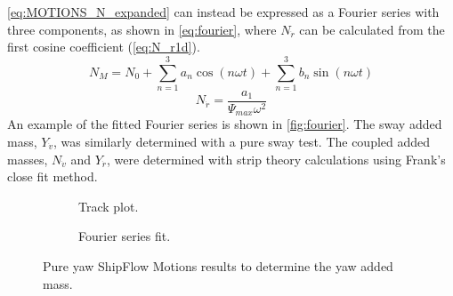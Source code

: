 \autoref{eq:MOTIONS_N_expanded} can instead be expressed as a Fourier series with three components, as shown in \autoref{eq:fourier}, where $N_{\dot{r}}$ can be calculated from the first cosine coefficient (\autoref{eq:N_r1d}).
\begin{equation}
    N_M = N_0 + \sum_{n=1}^3a_n \cos(n \omega t) + \sum_{n=1}^3b_n \sin(n \omega t) 
    \label{eq:fourier}
\end{equation}
\begin{equation}
    N_{\dot{r}} = \frac{a_1}{\Psi_{max} \omega^{2}}
    \label{eq:N_r1d}
\end{equation}
An example of the fitted Fourier series is shown in \autoref{fig:fourier}. The sway added mass, $Y_{\dot{v}}$, was similarly determined with a pure sway test. The coupled added masses, $N_{\dot{v}}$ and $Y_{\dot{r}}$, were determined with strip theory calculations using Frank's close fit method.
\begin{figure}[h]
    \centering
    \begin{subfigure}[b]{0.49\textwidth}
        
        \caption{Track plot.}
    \end{subfigure}
    \hfill
    \begin{subfigure}[b]{0.49\textwidth}
        
        \caption{Fourier series fit.}
    \end{subfigure}
    \caption{Pure yaw ShipFlow Motions results to determine the yaw added mass.}
    \label{fig:fourier}
\end{figure}